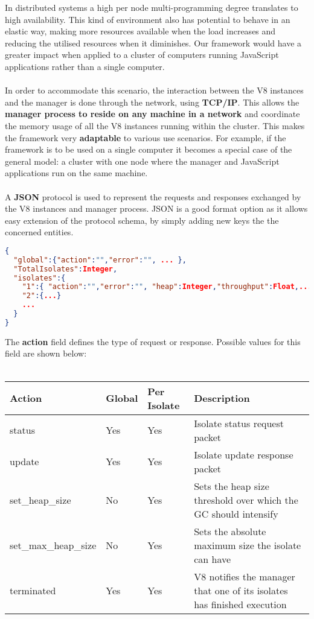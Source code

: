 \documentclass{l4proj}
\begin{document}
\hspace*{1em} In distributed systems a high per node multi-programming degree translates to high availability. This kind of environment also has potential to behave in an elastic way, making more resources available when the load increases and reducing the utilised resources when it diminishes. Our framework would have a greater impact when applied to a cluster of computers running JavaScript applications rather than a single computer.
\\\\
\hspace*{1em} In order to accommodate this scenario, the interaction between the V8 instances and the manager is done through the network, using \textbf{TCP/IP}. This allows the \textbf{manager process to reside on any machine in a network} and coordinate the memory usage of all the V8 instances running within the cluster. This makes the framework very \textbf{adaptable} to various use scenarios. For example, if the framework is to be used on a single computer it becomes a special case of the general model: a cluster with one node where the manager and JavaScript applications run on the same machine.
\\\\
\hspace*{1em} A \textbf{JSON} protocol is used to represent the requests and responses exchanged by the V8 instances and manager process. JSON is a good format option as it allows easy extension of the protocol schema, by simply adding new keys the the concerned entities.
\begin{lstlisting}[language=json,firstnumber=1]
{
  "global":{"action":"","error":"", ... },
  "TotalIsolates":Integer,
  "isolates":{
    "1":{ "action":"","error":"", "heap":Integer,"throughput":Float,... },
    "2":{...}
    ...
  }
}
\end{lstlisting}
The \textbf{action} field defines the type of request or response. Possible values for this field are shown below:\\\\
\begin{tabular}{  l  l  l  l  }
  Action & Global & Per Isolate & Description \\
\hline
  status & Yes & Yes & Isolate status request packet\\
  update & Yes & Yes & Isolate update response packet\\
  set\_heap\_size & No & Yes & Sets the heap size threshold over which the GC should intensify\\
  set\_max\_heap\_size & No & Yes & Sets the absolute maximum size the isolate can have\\
  terminated & Yes & Yes & V8 notifies the manager that one of its isolates has finished execution\\
\hline
\end{tabular}
\end{document}
